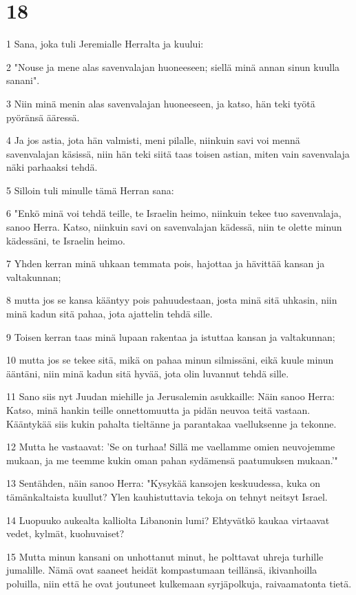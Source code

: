 \chapter{18}

\par 1 Sana, joka tuli Jeremialle Herralta ja kuului:
\par 2 "Nouse ja mene alas savenvalajan huoneeseen; siellä minä annan sinun kuulla sanani".
\par 3 Niin minä menin alas savenvalajan huoneeseen, ja katso, hän teki työtä pyöränsä ääressä.
\par 4 Ja jos astia, jota hän valmisti, meni pilalle, niinkuin savi voi mennä savenvalajan käsissä, niin hän teki siitä taas toisen astian, miten vain savenvalaja näki parhaaksi tehdä.
\par 5 Silloin tuli minulle tämä Herran sana:
\par 6 "Enkö minä voi tehdä teille, te Israelin heimo, niinkuin tekee tuo savenvalaja, sanoo Herra. Katso, niinkuin savi on savenvalajan kädessä, niin te olette minun kädessäni, te Israelin heimo.
\par 7 Yhden kerran minä uhkaan temmata pois, hajottaa ja hävittää kansan ja valtakunnan;
\par 8 mutta jos se kansa kääntyy pois pahuudestaan, josta minä sitä uhkasin, niin minä kadun sitä pahaa, jota ajattelin tehdä sille.
\par 9 Toisen kerran taas minä lupaan rakentaa ja istuttaa kansan ja valtakunnan;
\par 10 mutta jos se tekee sitä, mikä on pahaa minun silmissäni, eikä kuule minun ääntäni, niin minä kadun sitä hyvää, jota olin luvannut tehdä sille.
\par 11 Sano siis nyt Juudan miehille ja Jerusalemin asukkaille: Näin sanoo Herra: Katso, minä hankin teille onnettomuutta ja pidän neuvoa teitä vastaan. Kääntykää siis kukin pahalta tieltänne ja parantakaa vaelluksenne ja tekonne.
\par 12 Mutta he vastaavat: 'Se on turhaa! Sillä me vaellamme omien neuvojemme mukaan, ja me teemme kukin oman pahan sydämensä paatumuksen mukaan.'"
\par 13 Sentähden, näin sanoo Herra: "Kysykää kansojen keskuudessa, kuka on tämänkaltaista kuullut? Ylen kauhistuttavia tekoja on tehnyt neitsyt Israel.
\par 14 Luopuuko aukealta kalliolta Libanonin lumi? Ehtyvätkö kaukaa virtaavat vedet, kylmät, kuohuvaiset?
\par 15 Mutta minun kansani on unhottanut minut, he polttavat uhreja turhille jumalille. Nämä ovat saaneet heidät kompastumaan teillänsä, ikivanhoilla poluilla, niin että he ovat joutuneet kulkemaan syrjäpolkuja, raivaamatonta tietä.
